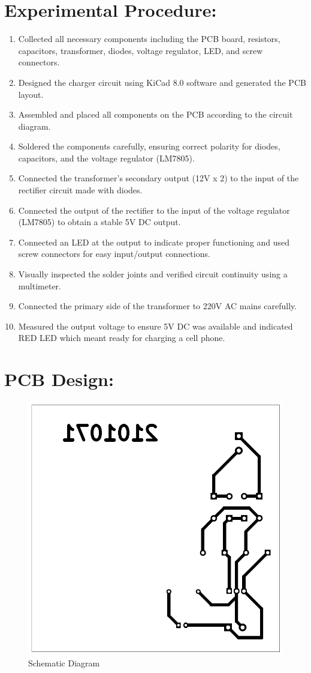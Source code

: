 \documentclass[a4paper,12pt]{article}
\begin{document}
\section*{Experimental Procedure:}

\begin{enumerate}
	\item Collected all necessary components including the PCB board, resistors, capacitors, transformer, diodes, voltage regulator, LED, and screw connectors.
	\item Designed the charger circuit using KiCad 8.0 software and generated the PCB layout.
	\item Assembled and placed all components on the PCB according to the circuit diagram.
	\item Soldered the components carefully, ensuring correct polarity for diodes, capacitors, and the voltage regulator (LM7805).
	\item Connected the transformer’s secondary output (12V x 2) to the input of the rectifier circuit made with diodes.
	\item Connected the output of the rectifier to the input of the voltage regulator (LM7805) to obtain a stable 5V DC output.
	\item Connected an LED at the output to indicate proper functioning and used screw connectors for easy input/output connections.
	\item Visually inspected the solder joints and verified circuit continuity using a multimeter.
	\item Connected the primary side of the transformer to 220V AC mains carefully.
	\item Measured the output voltage to ensure 5V DC was available and indicated RED LED which meant ready for charging a cell phone.
\end{enumerate}

	\section*{PCB Design:}
	\begin{figure}[H]
		\centering
		\includegraphics[width=0.51\linewidth]{"Images/7"}
		\caption{Schematic Diagram}
	\end{figure}
\end{document}
